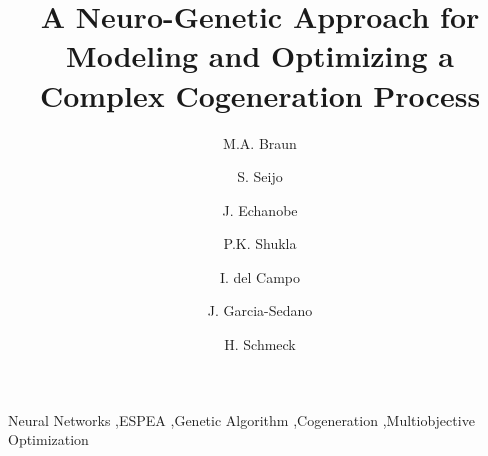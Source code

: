 \documentclass[preprint,12pt]{elsarticle}
\begin{document}
\begin{frontmatter}



\title{A Neuro-Genetic Approach for Modeling and Optimizing a Complex Cogeneration Process}


\author[kit]{M.A. Braun}
\author[upv]{S. Seijo}
\author[upv]{J. Echanobe}
\author[kit]{P.K. Shukla}
\author[upv]{I. del Campo}
\author[opt]{J. Garcia-Sedano}
\author[kit]{H. Schmeck}

\address[upv]{Department of Electricity and Electronics, UPV/EHU, Spain}
\address[opt]{Optimitive, Vitoria, Spain}
\address[kit]{Institute AIFB, KIT, Karlsruhe, Germany}

\begin{abstract}

\end{abstract}

\begin{keyword}
Neural Networks \sep ESPEA \sep Genetic Algorithm \sep Cogeneration \sep Multiobjective Optimization


\end{keyword}

\end{frontmatter}







\end{document}
